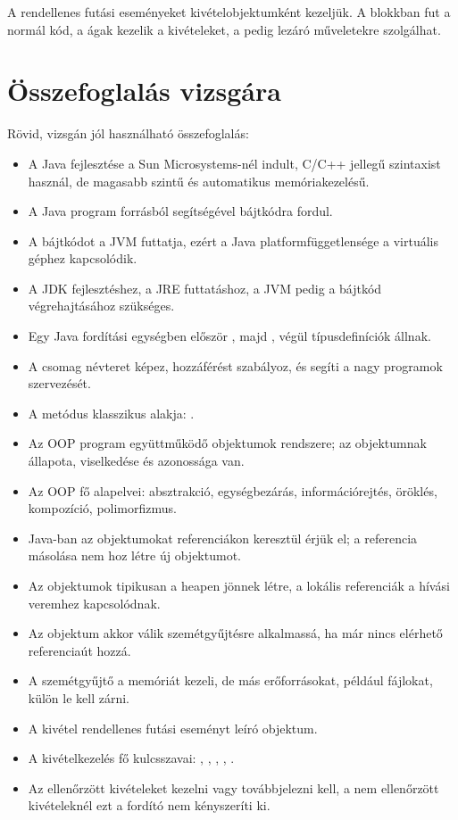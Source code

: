A rendellenes futási eseményeket kivételobjektumként kezeljük. A  blokkban fut a normál kód, a  ágak kezelik a kivételeket, a  pedig lezáró műveletekre szolgálhat.

\section{Összefoglalás vizsgára}

Rövid, vizsgán jól használható összefoglalás:

\begin{itemize}
  \item A Java fejlesztése a Sun Microsystems-nél indult, C/C++ jellegű szintaxist használ, de magasabb szintű és automatikus memóriakezelésű.
  \item A Java program  forrásból  segítségével  bájtkódra fordul.
  \item A bájtkódot a JVM futtatja, ezért a Java platformfüggetlensége a virtuális géphez kapcsolódik.
  \item A JDK fejlesztéshez, a JRE futtatáshoz, a JVM pedig a bájtkód végrehajtásához szükséges.
  \item Egy Java fordítási egységben először , majd , végül típusdefiníciók állnak.
  \item A csomag névteret képez, hozzáférést szabályoz, és segíti a nagy programok szervezését.
  \item A  metódus klasszikus alakja: .
  \item Az OOP program együttműködő objektumok rendszere; az objektumnak állapota, viselkedése és azonossága van.
  \item Az OOP fő alapelvei: absztrakció, egységbezárás, információrejtés, öröklés, kompozíció, polimorfizmus.
  \item Java-ban az objektumokat referenciákon keresztül érjük el; a referencia másolása nem hoz létre új objektumot.
  \item Az objektumok tipikusan a heapen jönnek létre, a lokális referenciák a hívási veremhez kapcsolódnak.
  \item Az objektum akkor válik szemétgyűjtésre alkalmassá, ha már nincs elérhető referenciaút hozzá.
  \item A szemétgyűjtő a memóriát kezeli, de más erőforrásokat, például fájlokat, külön le kell zárni.
  \item A kivétel rendellenes futási eseményt leíró objektum.
  \item A kivételkezelés fő kulcsszavai: , , , , .
  \item Az ellenőrzött kivételeket kezelni vagy továbbjelezni kell, a nem ellenőrzött kivételeknél ezt a fordító nem kényszeríti ki.
\end{itemize}
